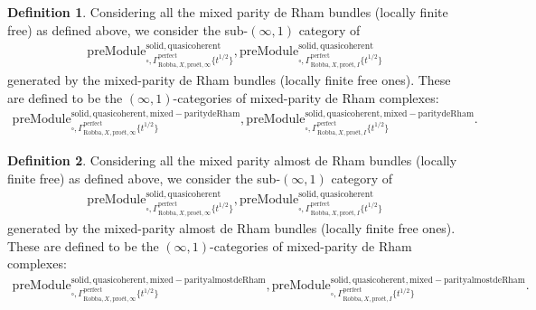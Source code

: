 \documentclass[12pt]{book}
\theoremstyle{definition}
\newtheorem{definition}{Definition}
\begin{document}
\begin{definition}
Considering all the mixed parity de Rham bundles (locally finite free) as defined above, we consider the sub-$(\infty,1)$ category of 
\begin{align}
\mathrm{preModule}^\mathrm{solid,quasicoherent}_{\square,\Gamma^\mathrm{perfect}_{\text{Robba},X,\text{pro\'et},\infty}\{t^{1/2}\}},
\mathrm{preModule}^\mathrm{solid,quasicoherent}_{\square,\Gamma^\mathrm{perfect}_{\text{Robba},X,\text{pro\'et},I}\{t^{1/2}\}} 
\end{align}
generated by the mixed-parity de Rham bundles (locally finite free ones). These are defined to be the $(\infty,1)$-categories of mixed-parity de Rham complexes:
\begin{align}
\mathrm{preModule}^\mathrm{solid,quasicoherent,mixed-paritydeRham}_{\square,\Gamma^\mathrm{perfect}_{\text{Robba},X,\text{pro\'et},\infty}\{t^{1/2}\}},
\mathrm{preModule}^\mathrm{solid,quasicoherent,mixed-paritydeRham}_{\square,\Gamma^\mathrm{perfect}_{\text{Robba},X,\text{pro\'et},I}\{t^{1/2}\}}. 
\end{align}
\end{definition}


\begin{definition}
Considering all the mixed parity almost de Rham bundles (locally finite free) as defined above, we consider the sub-$(\infty,1)$ category of 
\begin{align}
\mathrm{preModule}^\mathrm{solid,quasicoherent}_{\square,\Gamma^\mathrm{perfect}_{\text{Robba},X,\text{pro\'et},\infty}\{t^{1/2}\}},
\mathrm{preModule}^\mathrm{solid,quasicoherent}_{\square,\Gamma^\mathrm{perfect}_{\text{Robba},X,\text{pro\'et},I}\{t^{1/2}\}} 
\end{align}
generated by the mixed-parity almost de Rham bundles (locally finite free ones). These are defined to be the $(\infty,1)$-categories of mixed-parity de Rham complexes:
\begin{align}
\mathrm{preModule}^\mathrm{solid,quasicoherent,mixed-parityalmostdeRham}_{\square,\Gamma^\mathrm{perfect}_{\text{Robba},X,\text{pro\'et},\infty}\{t^{1/2}\}},
\mathrm{preModule}^\mathrm{solid,quasicoherent,mixed-parityalmostdeRham}_{\square,\Gamma^\mathrm{perfect}_{\text{Robba},X,\text{pro\'et},I}\{t^{1/2}\}}. 
\end{align}
\end{definition}
\end{document}
